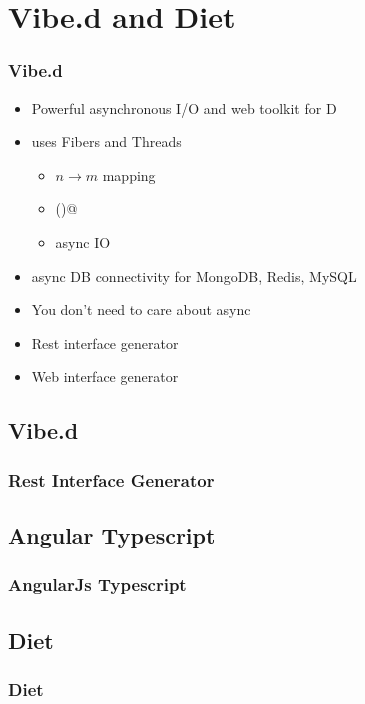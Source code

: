 \documentclass[xelatex,13pt]{beamer}
\begin{document}
\section{Vibe.d and Diet}
\begin{frame}
	\frametitle{Vibe.d}
	\begin{itemize}
		\item Powerful asynchronous I/O and web toolkit for D
		\item uses Fibers and Threads
			\pause
			\begin{itemize}
				\item \(n \rightarrow m\) mapping
				\item \lstinline@yield()@
				\item async IO
			\end{itemize}
			\pause
		\item async DB connectivity for MongoDB, Redis, MySQL
		\item You don't need to care about async
		\item Rest interface generator
		\item Web interface generator
	\end{itemize}
\end{frame}

\subsection{Vibe.d}
\begin{frame}
	\frametitle{Rest Interface Generator}
	
	\pause
	
	\pause
	
\end{frame}

\subsection{Angular Typescript}
\begin{frame}
	\frametitle{AngularJs Typescript}
	
\end{frame}

\subsection{Diet}
\begin{frame}
	\frametitle{Diet}
	
	\pause
	
	\pause
	
\end{frame}
\end{document}
